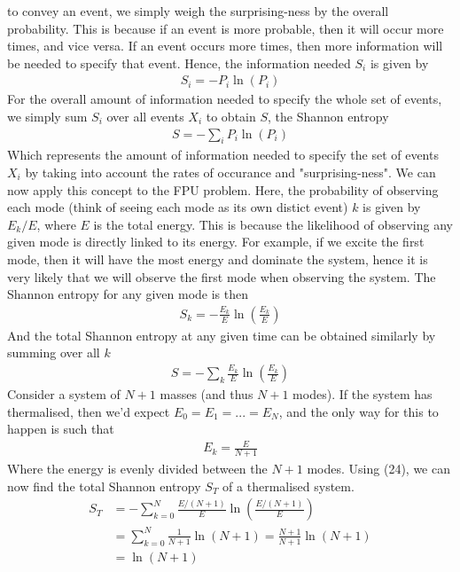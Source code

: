 \documentclass{article}
\begin{document}
to convey an event, we simply weigh the surprising-ness by the overall probability. This is 
because if an event is more probable, then it will occur more times, and vice versa. If 
an event occurs more times, then more information will be needed to specify that event. Hence, 
the information needed $S_i$ is given by 
\begin{align}
    S_i=-P_i\ln(P_i)
\end{align}
For the overall amount of information needed to 
specify the whole set of events, we simply sum $S_i$ over all events $X_i$ to obtain $S$, 
the Shannon entropy 
\begin{align}
    S=-\sum_{i}P_i\ln(P_i)
\end{align}
Which represents the amount of information needed to specify the set of 
events $X_i$ by taking into account 
the rates of occurance and "surprising-ness". We can now apply this concept to the 
FPU problem. Here, the probability of observing each mode 
(think of seeing each mode as its own distict event) $k$ is given by $E_k/E$, where $E$ is the 
total energy. This is because the likelihood
of observing any given mode is directly linked to its energy. For example, 
if we excite the first mode, then it will have the most energy and dominate the system, 
hence it is very likely that we will observe the first mode when observing the system.
The Shannon entropy for any given mode 
is then 
\begin{align}
    S_k=-\frac{E_k}{E}\ln(\frac{E_k}{E})
\end{align}
And the total Shannon entropy at any given time can be obtained similarly by summing over all $k$
\begin{align}
    S=-\sum_k\frac{E_k}{E}\ln(\frac{E_k}{E})
\end{align}
Consider a system of $N+1$ masses (and thus $N+1$ modes). If the system has thermalised, 
then we'd expect $E_0=E_1=...=E_N$, and 
the only way for this to happen is such that 
\begin{align}
    E_k=\frac{E}{N+1}
\end{align}
Where the energy is evenly divided between the $N+1$ modes. Using (24), 
we can now find the total Shannon entropy $S_T$ of a thermalised system.
\begin{align}
    S_T&=-\sum_{k=0}^N\frac{E/(N+1)}{E}\ln(\frac{E/(N+1)}{E})\\ 
    &=\sum_{k=0}^N\frac{1}{N+1}\ln(N+1) = \frac{N+1}{N+1}\ln(N+1)\\ 
    &= \ln(N+1)
\end{align}
\end{document}
